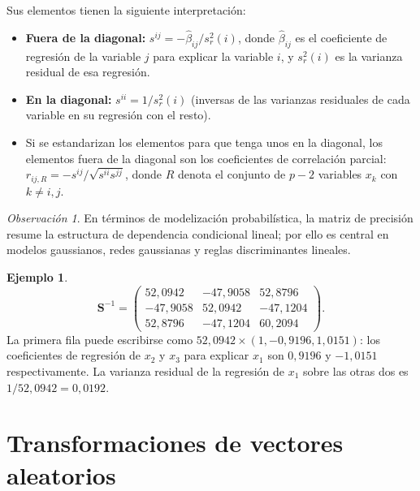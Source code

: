 \documentclass[12pt, a4paper]{article}
\theoremstyle{plain}
\theoremstyle{definition}
\newtheorem{ejemplo}{Ejemplo}[section]
\theoremstyle{remark}
\newtheorem*{observacion}{Observación}
\newcommand{\mat}[1]{\mathbf{#1}}
\begin{document}
Sus elementos tienen la siguiente interpretación:
\begin{itemize}
  \item \textbf{Fuera de la diagonal:}
        $s^{ij} = -\hat{\beta}_{ij}/s_r^2(i)$,
        donde $\hat{\beta}_{ij}$ es el coeficiente de regresión de la variable
        $j$ para explicar la variable $i$, y $s_r^2(i)$ es la varianza
        residual de esa regresión.
  \item \textbf{En la diagonal:} $s^{ii} = 1/s_r^2(i)$ (inversas de las
        varianzas residuales de cada variable en su regresión con el resto).
  \item Si se estandarizan los elementos para que tenga unos en la diagonal,
        los elementos fuera de la diagonal son los coeficientes de correlación
        parcial:
        $r_{ij,R} = -s^{ij}/\sqrt{s^{ii}s^{jj}}$,
        donde $R$ denota el conjunto de $p-2$ variables $x_k$ con $k\neq i,j$.
\end{itemize}

\begin{observacion}
En términos de modelización probabilística, la matriz de precisión resume la
estructura de dependencia condicional lineal; por ello es central en modelos
gaussianos, redes gaussianas y reglas discriminantes lineales.
\end{observacion}

\begin{ejemplo}
\[
  \mat{S}^{-1} = \begin{pmatrix}
    52{,}0942 & -47{,}9058 & 52{,}8796 \\
    -47{,}9058 & 52{,}0942 & -47{,}1204 \\
    52{,}8796 & -47{,}1204 & 60{,}2094
  \end{pmatrix}.
\]
La primera fila puede escribirse como $52{,}0942\times(1,-0{,}9196,1{,}0151)$:
los coeficientes de regresión de $x_2$ y $x_3$ para explicar $x_1$ son
$0{,}9196$ y $-1{,}0151$ respectivamente. La varianza residual de la regresión
de $x_1$ sobre las otras dos es $1/52{,}0942 = 0{,}0192$.
\end{ejemplo}

\section{Transformaciones de vectores aleatorios}
\end{document}

